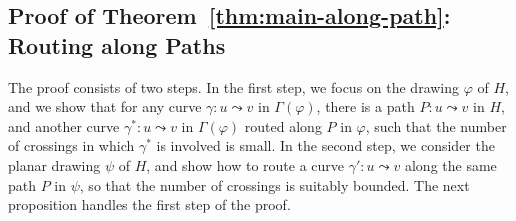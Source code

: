 \documentclass[twoside,leqno,twocolumn]{article}
\newcommand{\connect}{\leadsto}
\renewcommand{\phi}{\varphi}
\begin{document}
\subsection{Proof of Theorem~\ref{thm:main-along-path}: Routing along Paths}\label{sec:routing along paths}
The proof consists of two steps. In the first step, we focus on the drawing $\phi$ of $H$, and we show that for any curve $\gamma:u\connect v$ in $\Gamma(\phi)$, there is a path $P:u\connect v$ in $H$, and another curve $\gamma^*: u\connect v$ in $\Gamma(\phi)$ routed along $P$ in $\phi$, such that the number of crossings in which $\gamma^*$ is involved is small. In the second step, we consider the planar drawing $\psi$ of $H$, and show how to route a curve $\gamma':u\connect v$ along the same path $P$ in $\psi$, so that the number of crossings is suitably bounded. The next proposition handles the first step of the proof.
\end{document}
